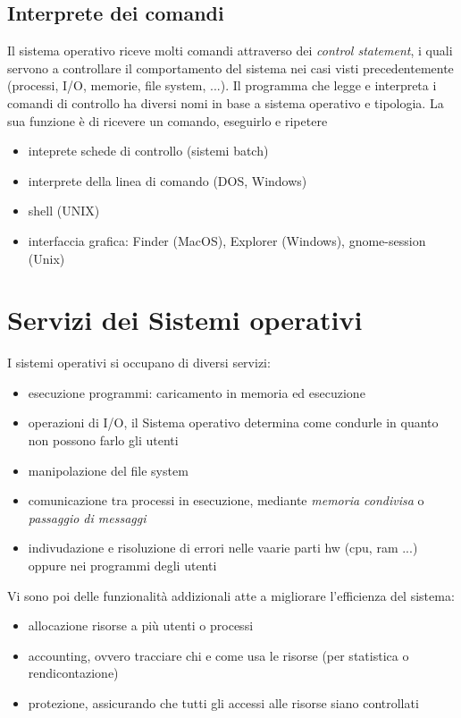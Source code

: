 \documentclass{article}
\begin{document}
\subsection{Interprete dei comandi}
Il sistema operativo riceve molti comandi attraverso dei \textit{control statement}, 
i quali servono a controllare il comportamento del sistema nei casi visti precedentemente (processi, I/O, memorie, file system, ...).
Il programma che legge e interpreta i comandi di controllo ha diversi nomi in base a sistema operativo e tipologia. La sua funzione
è di ricevere un comando, eseguirlo e ripetere
\begin{itemize}
    \item inteprete schede di controllo (sistemi batch)
    \item interprete della linea di comando (DOS, Windows)
    \item shell (UNIX)
    \item interfaccia grafica: Finder (MacOS), Explorer (Windows), gnome-session (Unix)
\end{itemize}

\section{Servizi dei Sistemi operativi}
I sistemi operativi si occupano di diversi servizi: 
\begin{itemize}
    \item esecuzione programmi: caricamento in memoria ed esecuzione
    \item operazioni di I/O, il Sistema operativo determina come condurle in quanto non possono farlo gli utenti
    \item manipolazione del file system
    \item comunicazione tra processi in esecuzione, mediante \textit{memoria condivisa} o \textit{passaggio di messaggi}
    \item indivudazione e risoluzione di errori nelle vaarie parti hw (cpu, ram ...) oppure nei programmi degli utenti
\end{itemize}
Vi sono poi delle funzionalità addizionali atte a migliorare l'efficienza del sistema:
\begin{itemize}
    \item allocazione risorse a più utenti o processi 
    \item accounting, ovvero tracciare chi e come usa le risorse (per statistica o rendicontazione)
    \item protezione, assicurando che tutti gli accessi alle risorse siano controllati
\end{itemize}
\end{document}
